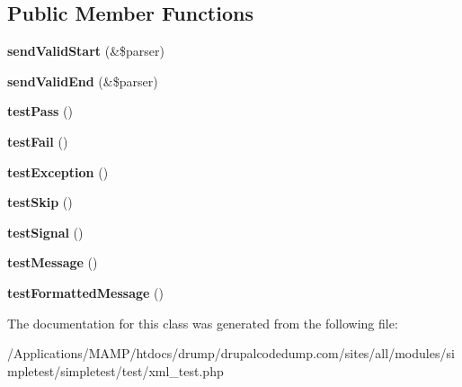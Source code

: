 \subsection*{Public Member Functions}
\begin{DoxyCompactItemize}
\item 
\hypertarget{class_test_of_xml_results_parsing_a12cf8703bc489a152b78e2d266e7a9fc}{
{\bfseries sendValidStart} (\&\$parser)}
\label{class_test_of_xml_results_parsing_a12cf8703bc489a152b78e2d266e7a9fc}

\item 
\hypertarget{class_test_of_xml_results_parsing_a03ea315f308d250acefac27bfb5528e6}{
{\bfseries sendValidEnd} (\&\$parser)}
\label{class_test_of_xml_results_parsing_a03ea315f308d250acefac27bfb5528e6}

\item 
\hypertarget{class_test_of_xml_results_parsing_aaf4f829fb4361f35b013ce984efc477c}{
{\bfseries testPass} ()}
\label{class_test_of_xml_results_parsing_aaf4f829fb4361f35b013ce984efc477c}

\item 
\hypertarget{class_test_of_xml_results_parsing_ad89cbf42454750dac8da87d5c454623e}{
{\bfseries testFail} ()}
\label{class_test_of_xml_results_parsing_ad89cbf42454750dac8da87d5c454623e}

\item 
\hypertarget{class_test_of_xml_results_parsing_a987e041a0c7db243372d3b4fa9dfe83a}{
{\bfseries testException} ()}
\label{class_test_of_xml_results_parsing_a987e041a0c7db243372d3b4fa9dfe83a}

\item 
\hypertarget{class_test_of_xml_results_parsing_a99ab0e189ce86d13b87769ad4777547e}{
{\bfseries testSkip} ()}
\label{class_test_of_xml_results_parsing_a99ab0e189ce86d13b87769ad4777547e}

\item 
\hypertarget{class_test_of_xml_results_parsing_a7170251147dc293f275670f4abd041d6}{
{\bfseries testSignal} ()}
\label{class_test_of_xml_results_parsing_a7170251147dc293f275670f4abd041d6}

\item 
\hypertarget{class_test_of_xml_results_parsing_ab5f981322f10b6fdfc5e4d0341de8b20}{
{\bfseries testMessage} ()}
\label{class_test_of_xml_results_parsing_ab5f981322f10b6fdfc5e4d0341de8b20}

\item 
\hypertarget{class_test_of_xml_results_parsing_acb34dd65b33a929c865005313380da40}{
{\bfseries testFormattedMessage} ()}
\label{class_test_of_xml_results_parsing_acb34dd65b33a929c865005313380da40}

\end{DoxyCompactItemize}


The documentation for this class was generated from the following file:\begin{DoxyCompactItemize}
\item 
/Applications/MAMP/htdocs/drump/drupalcodedump.com/sites/all/modules/simpletest/simpletest/test/xml\_\-test.php\end{DoxyCompactItemize}
